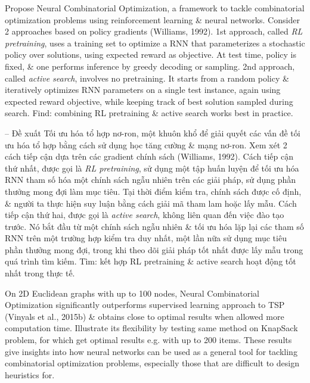 \documentclass{article}
\begin{document}
\begin{itemize}
    Propose Neural Combinatorial Optimization, a framework to tackle combinatorial optimization problems using reinforcement learning \& neural networks. Consider 2 approaches based on policy gradients (Williams, 1992). 1st approach, called {\it RL pretraining}, uses a training set to optimize a RNN that parameterizes a stochastic policy over solutions, using expected reward as objective. At test time, policy is fixed, \& one performs inference by greedy decoding or sampling. 2nd approach, called {\it active search}, involves no pretraining. It starts from a random policy \& iteratively optimizes RNN parameters on a single test instance, again using expected reward objective, while keeping track of best solution sampled during search. Find: combining RL pretraining \& active search works best in practice.
    
    -- Đề xuất Tối ưu hóa tổ hợp nơ-ron, một khuôn khổ để giải quyết các vấn đề tối ưu hóa tổ hợp bằng cách sử dụng học tăng cường \& mạng nơ-ron. Xem xét 2 cách tiếp cận dựa trên các gradient chính sách (Williams, 1992). Cách tiếp cận thứ nhất, được gọi là {\it RL pretraining}, sử dụng một tập huấn luyện để tối ưu hóa RNN tham số hóa một chính sách ngẫu nhiên trên các giải pháp, sử dụng phần thưởng mong đợi làm mục tiêu. Tại thời điểm kiểm tra, chính sách được cố định, \& người ta thực hiện suy luận bằng cách giải mã tham lam hoặc lấy mẫu. Cách tiếp cận thứ hai, được gọi là {\it active search}, không liên quan đến việc đào tạo trước. Nó bắt đầu từ một chính sách ngẫu nhiên \& tối ưu hóa lặp lại các tham số RNN trên một trường hợp kiểm tra duy nhất, một lần nữa sử dụng mục tiêu phần thưởng mong đợi, trong khi theo dõi giải pháp tốt nhất được lấy mẫu trong quá trình tìm kiếm. Tìm: kết hợp RL pretraining \& active search hoạt động tốt nhất trong thực tế.
    
    On 2D Euclidean graphs with up to 100 nodes, Neural Combinatorial Optimization significantly outperforms supervised learning approach to TSP (Vinyals et al., 2015b) \& obtains close to optimal results when allowed more computation time. Illustrate its flexibility by testing same method on KnapSack problem, for which get optimal results e.g. with up to 200 items. These results give insights into how neural networks can be used as a general tool for tackling combinatorial optimization problems, especially those that are difficult to design heuristics for.
    

\end{itemize}
\end{document}
